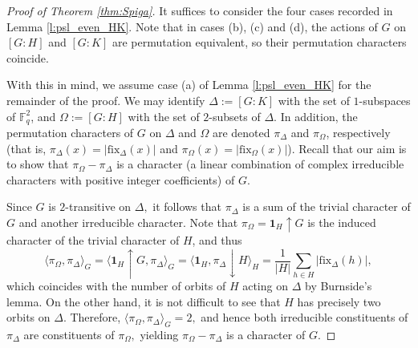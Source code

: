 \documentclass[twoside,a4paper,reqno,11pt]{amsart}
\newcommand{\<}{\langle}
\renewcommand{\>}{\rangle}
\newcommand{\la}{\langle}
\newcommand{\ra}{\rangle}
\newcommand{\leqs}{\leqslant}
\newcommand{\SL}{\mathrm{SL}}
\newcommand{\fix}{\mathrm{fix}}
\theoremstyle{definition}
\begin{document}
\begin{proof}[Proof of Theorem \ref{thm:Spiga}]
	It suffices to consider the four cases recorded in Lemma \ref{l:psl_even_HK}.
	Note that in cases (b), (c) and (d), the actions of $G$ on $[G:H]$ and $[G:K]$ are permutation equivalent, so their permutation characters coincide.
	
	With this in mind, we assume case (a) of Lemma \ref{l:psl_even_HK} for the remainder of the proof. We may identify $\Delta:=[G:K]$ with the set of $1$-subspaces of $\mathbb{F}_q^2$, and $\Omega:=[G:H]$ with the set of $2$-subsets of $\Delta$. In addition, the permutation characters of $G$ on $\Delta$ and $\Omega$ are denoted $\pi_\Delta$ and $\pi_\Omega$, respectively (that is, $\pi_\Delta(x) = |\fix_\Delta(x)|$ and $\pi_\Omega(x) = |\fix_\Omega(x)|$). Recall that our aim is to show that $\pi_\Omega-\pi_\Delta$ is a character (a linear combination of complex irreducible characters with positive integer coefficients) of $G$.
	
	Since $G$ is $2$-transitive on $\Delta,$ it follows that $\pi_{\Delta}$ is a sum of the trivial character of $G$ and another irreducible character. Note that $\pi_{\Omega}=\mathbf{1}_H \uparrow G$ is the induced character of the trivial character of $H$, and thus
	\begin{equation*}
	\la \pi_{\Omega}, \pi_{\Delta} \ra_G=\la \mathbf{1}_H \uparrow G, \pi_{\Delta} \ra_G= \la \mathbf{1}_H , \pi_{\Delta} \downarrow H \ra_H =\frac{1}{|H|}\sum_{h\in H}|\fix_\Delta(h)|,
	\end{equation*}
	which coincides with the number of orbits of $H$ acting on $\Delta$ by Burnside's lemma. On the other hand, it is not difficult to see that $H$ has precisely two orbits on $\Delta$.
	Therefore, $\la \pi_{\Omega}, \pi_{\Delta} \ra_G=2,$ and hence both irreducible constituents of $\pi_{\Delta}$ are constituents of  $\pi_{\Omega},$ yielding $\pi_{\Omega}-\pi_{\Delta}$ is a character of $G$.
\end{proof}
	
	
	
	
	
\end{document}
